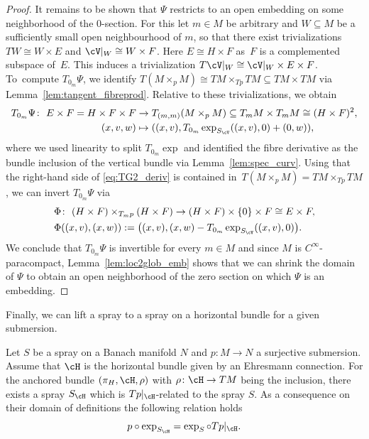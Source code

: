 \begin{proof}
It remains to be shown that $\Psi$ restricts to an open embedding on some neighborhood of the $0$-section. For this let $m \in M$ be arbitrary and $W \subseteq M$ be a sufficiently small open neighbourhood of $m$, so that there exist trivializations $TW \cong W \times E$ and $\cV|_{W} \cong W \times F$. Here $E \cong H\times F$ as~$F$ is a complemented subspace of~$E$. This induces a trivialization $T\cV|_{W} \cong \cV|_{W} \times E \times F$. To~compute $T_{0_m}\Psi$, we identify $T(M\times_p M)\cong TM\times_{Tp} TM\subseteq TM \times TM$ via Lemma~\ref{lem:tangent_fibreprod}. Relative to these trivializations, we obtain
\begin{align}
 T_{0_{m}}\Psi\colon\ E \times F = H\times F \times F &\rightarrow T_{(m,m)}(M \times_{p} M) \subseteq T_{m}M \times T_{m}M \cong (H\times F)^2, \notag \\
 (x,v,w) &\mapsto ((x,v), T_{0_{m}}\exp_{S_{\cV}}((x,v),0) + (0,w)),\label{eq:TG2_deriv}
\end{align}
where we used linearity to split $T_{0_m}\exp$ and identified the fibre derivative as the bundle inclusion of the vertical bundle via Lemma~\ref{lem:spec_curv}. Using that the right-hand side of \eqref{eq:TG2_deriv} is contained in~${T(M\times_p M)=TM \times_{Tp} TM}$, we can invert $T_{0_m}\Psi$ via
\begin{align*}&\Phi\colon\ (H \times F)\times_{T_mp} (H\times F)\rightarrow (H\times F) \times \{0\} \times F \cong E \times F,\\
&\Phi ((x,v),(x,w)):= \bigl((x,v),(x,w)-T_{0_m}\exp_{S_\cV}((x,v),0)\bigr).
\end{align*}
We conclude that $T_{0_m}\Psi$ is invertible for every $m \in M$ and since $M$ is $C^\infty$-paracompact, Lemma~\ref{lem:loc2glob_emb} shows that we can shrink the domain of $\Psi$ to obtain an open neighborhood of the zero section on which $\Psi$ is an embedding.
\end{proof}


Finally, we can lift a spray to a spray on a horizontal bundle for a given submersion.

\begin{Lemma}\label{lem:spray_lifting}
Let $S$ be a spray on a Banach manifold $N$ and $p \colon M \rightarrow N$ a surjective submersion. Assume that $\cH$ is the horizontal bundle given by an Ehresmann connection. For the anchored bundle $(\pi_H,\cH, \rho)$ with $\rho \colon \cH \rightarrow TM$ being the inclusion, there exists a spray $S_\cH$ which is $Tp|_{\cH}$-related to the spray $S$.
As a consequence on their domain of definitions the following relation holds
\begin{displaymath} p\circ \exp_{S_\cH} = \exp_S \circ Tp|_{\cH}.\end{displaymath}
\end{Lemma}

